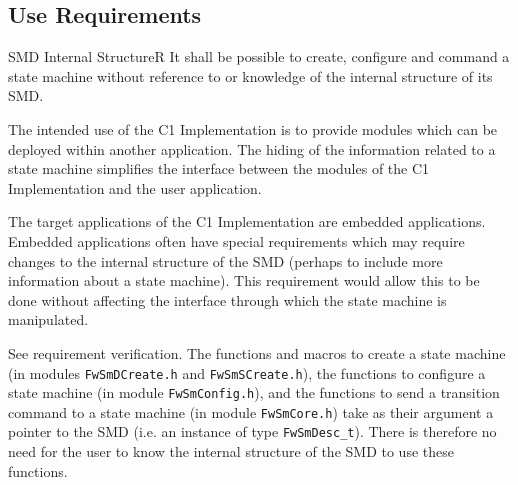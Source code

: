 \documentclass[a4paper,10pt]{article}
\newenvironment{fw_req}[6]
{\addtocounter{subsubsection}{1}
	\hspace{0.2cm}\textbf{FW-\arabic{section}.\arabic{subsection}.\arabic{subsubsection}/#2
	\hspace{0.8cm} #1}
	\vspace{-10pt}
\begin{longtable}{p{2.7cm}P{8.5cm}}
\hline
\textsc{Requirement} & #3 \\
\textsc{Justification} & #4 \\
\textsc{Implementation} & #5  \\ 
\textsc{Verification} & #6  \\
\hline
}
{\end{longtable}}
\begin{document}
\subsection{Use Requirements}\label{req:userReqsSMD}

\begin{fw_req}{SMD Internal Structure}{R}
{It shall be possible to create, configure and command a state
 machine without reference to or knowledge of the internal structure of its SMD.}
{The intended use of the C1 Implementation is to provide modules 
which can be deployed within another application. 
The hiding of the information related to a state machine simplifies the interface between 
the modules of the C1 Implementation and the user application.

The target applications of the C1 Implementation are embedded applications. 
Embedded applications often have special requirements which may require changes to the internal 
structure of the SMD (perhaps to include more information about a state machine). 
This requirement would allow this to be done without affecting the interface through which 
the state machine is manipulated.} 
{See requirement verification.} 
{The functions and macros to create a state machine 
(in modules \texttt{FwSmDCreate.h} and \texttt{FwSmSCreate.h}), 
the functions to configure a state machine (in module \texttt{FwSmConfig.h}), and the 
functions to send a transition command to a state machine (in module \texttt{FwSmCore.h}) 
take as their argument a pointer to the SMD (i.e. an instance of type \texttt{FwSmDesc\_t}). 
There is therefore no need for the user to know the internal structure of the SMD to use these functions.}
\end{fw_req}
\end{document}
